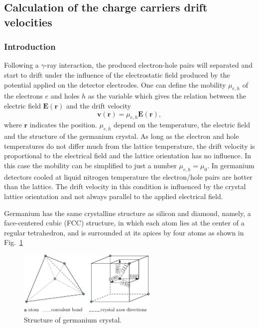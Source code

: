 \subsection{Calculation of the charge carriers drift velocities}
\label{sec:drift}

\subsubsection{Introduction}
\label{sec:drin}
Following a $\gamma$-ray interaction, the produced electron-hole pairs
will separated and start to drift under the influence of the
electrostatic field produced by the potential applied on the detector
electrodes. One can define the mobility $\mu_{e,h}$ of the electrons
$e$ and holes $h$ as the variable which gives the relation between the
electric field $\mathbf{E}(\mathbf{r})$ and the drift velocity
\begin{equation}
  \label{eq:mobi}
  \mathbf{v}(\mathbf{r}) = \mu_{e,h} \mathbf{E}(\mathbf{r}),
\end{equation}
where $\mathbf{r}$ indicates the position. $\mu_{e,h}$ depend on the
temperature, the electric field and the structure of the germanium
crystal. As long as the electron and hole temperatures do not differ
much from the lattice temperature, the drift velocity is proportional
to the electrical field and the lattice orientation has no influence.
In this case the mobility can be simplified to just a number
$\mu_{e,h} = \mu_{0}$. In germanium detectors cooled at liquid
nitrogen temperature the electron/hole pairs are hotter than the
lattice. The drift velocity in this condition is influenced by the
crystal lattice orientation and not always parallel to the applied
electrical field.

Germanium has the same crystalline structure as silicon and diamond, namely, a face-centered cubic (FCC) structure, in which each atom lies at the center of a regular tetrahedron, and is surrounded at its apices by four atoms as shown in Fig.~\ref{fig:xtal}
\begin{figure}[tbhp]
  \centering
  \includegraphics[width=0.6\textwidth]{xtalStruc}  
  \caption{Structure of germanium crystal.}
  \label{fig:xtal}
\end{figure}

